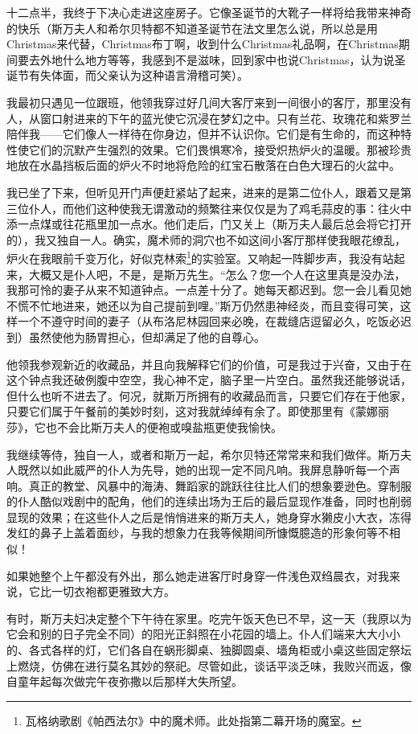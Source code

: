 \par 十二点半，我终于下决心走进这座房子。它像圣诞节的大靴子一样将给我带来神奇的快乐（斯万夫人和希尔贝特都不知道圣诞节在法文里怎么说，所以总是用Christmas来代替，Christmas布丁啊，收到什么Christmas礼品啊，在Christmas期间要去外地什么地方等等，我感到不是滋味，回到家中也说Christmas，认为说圣诞节有失体面，而父亲认为这种语言滑稽可笑）。
\par 我最初只遇见一位跟班，他领我穿过好几间大客厅来到一间很小的客厅，那里没有人，从窗口射进来的下午的蓝光使它沉浸在梦幻之中。只有兰花、玫瑰花和紫罗兰陪伴我——它们像人一样待在你身边，但并不认识你。它们是有生命的，而这种特性使它们的沉默产生强烈的效果。它们畏惧寒冷，接受炽热炉火的温暖。那被珍贵地放在水晶挡板后面的炉火不时地将危险的红宝石散落在白色大理石的火盆中。
\par 我已坐了下来，但听见开门声便赶紧站了起来，进来的是第二位仆人，跟着又是第三位仆人，而他们这种使我无谓激动的频繁往来仅仅是为了鸡毛蒜皮的事：往火中添一点煤或往花瓶里加一点水。他们走后，门又关上（斯万夫人最后总会将它打开的），我又独自一人。确实，魔术师的洞穴也不如这间小客厅那样使我眼花缭乱，炉火在我眼前千变万化，好似克林索\footnote{瓦格纳歌剧《帕西法尔》中的魔术师。此处指第二幕开场的魔室。}的实验室。又响起一阵脚步声，我没有站起来，大概又是仆人吧，不是，是斯万先生。“怎么？您一个人在这里真是没办法，我那可怜的妻子从来不知道钟点。一点差十分了。她每天都迟到。您一会儿看见她不慌不忙地进来，她还以为自己提前到哩。”斯万仍然患神经炎，而且变得可笑，这样一个不遵守时间的妻子（从布洛尼林园回来必晚，在裁缝店逗留必久，吃饭必迟到）虽然使他为肠胃担心，但却满足了他的自尊心。
\par 他领我参观新近的收藏品，并且向我解释它们的价值，可是我过于兴奋，又由于在这个钟点我还破例腹中空空，我心神不定，脑子里一片空白。虽然我还能够说话，但什么也听不进去了。何况，就斯万所拥有的收藏品而言，只要它们存在于他家，只要它们属于午餐前的美妙时刻，这对我就绰绰有余了。即使那里有《蒙娜丽莎》，它也不会比斯万夫人的便袍或嗅盐瓶更使我愉快。
\par 我继续等侍，独自一人，或者和斯万一起，希尔贝特还常常来和我们做伴。斯万夫人既然以如此威严的仆人为先导，她的出现一定不同凡响。我屏息静听每一个声响。真正的教堂、风暴中的海涛、舞蹈家的跳跃往往比人们的想象要逊色。穿制服的仆人酷似戏剧中的配角，他们的连续出场为王后的最后显现作准备，同时也削弱显现的效果；在这些仆人之后是悄悄进来的斯万夫人，她身穿水獭皮小大衣，冻得发红的鼻子上盖着面纱，与我的想象力在我等候期间所慷慨臆造的形象何等不相似！
\par 如果她整个上午都没有外出，那么她走进客厅时身穿一件浅色双绉晨衣，对我来说，它比一切衣袍都更雅致大方。
\par 有时，斯万夫妇决定整个下午待在家里。吃完午饭天色已不早，这一天（我原以为它会和别的日子完全不同）的阳光正斜照在小花园的墙上。仆人们端来大大小小的、各式各样的灯，它们各自在蜗形脚桌、独脚圆桌、墙角柜或小桌这些固定祭坛上燃烧，仿佛在进行莫名其妙的祭祀。尽管如此，谈话平淡乏味，我败兴而返，像自童年起每次做完午夜弥撒以后那样大失所望。
